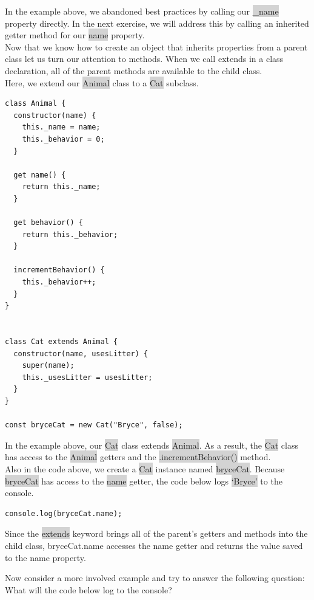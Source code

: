 \documentclass[11pt]{article}
\begin{document}
In the example above, we abandoned best practices by calling our \colorbox{lightgray}{\_name} property directly. In the next exercise, we will address this by calling an inherited getter method for our \colorbox{lightgray}{name} property. \\
\newline
Now that we know how to create an object that inherits properties from a parent class let us turn our attention to methods. When we call extends in a class declaration, all of the parent methods are available to the child class. \\
\newline
Here, we extend our \colorbox{lightgray}{Animal} class to a \colorbox{lightgray}{Cat} subclass.
\newpage
\begin{lstlisting}
class Animal {
  constructor(name) {
    this._name = name;
    this._behavior = 0;
  }

  get name() {
    return this._name;
  }

  get behavior() {
    return this._behavior;
  }

  incrementBehavior() {
    this._behavior++;
  }
} 


class Cat extends Animal {
  constructor(name, usesLitter) {
    super(name);
    this._usesLitter = usesLitter;
  }
}

const bryceCat = new Cat("Bryce", false);
\end{lstlisting}
In the example above, our \colorbox{lightgray}{Cat} class extends \colorbox{lightgray}{Animal}. As a result, the \colorbox{lightgray}{Cat} class has access to the \colorbox{lightgray}{Animal} getters and the \colorbox{lightgray}{.incrementBehavior()} method. \\
\newline
Also in the code above, we create a \colorbox{lightgray}{Cat} instance named \colorbox{lightgray}{bryceCat}. Because \colorbox{lightgray}{bryceCat} has access to the \colorbox{lightgray}{name} getter, the code below logs \colorbox{lightgray}{`Bryce'} to the console. 
\begin{lstlisting}
console.log(bryceCat.name);
\end{lstlisting}
Since the  \colorbox{lightgray}{extends} keyword brings all of the parent’s getters and methods into the child class, bryceCat.name accesses the name getter and returns the value saved to the name property.

Now consider a more involved example and try to answer the following question: What will the code below log to the console?
\end{document}
